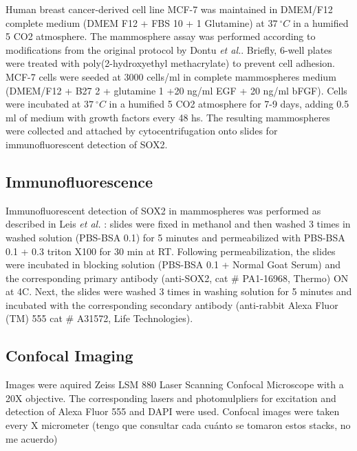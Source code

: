 \documentclass[fleqn,10pt]{wlscirep}
\begin{document}
Human breast cancer-derived cell line MCF-7 was maintained in DMEM/F12 complete medium (DMEM F12 + FBS 10 + 1 Glutamine) at $37 \ ^{\circ} C$ in a humified 5 CO2 atmosphere. The mammosphere assay was performed according to modifications \cite{Leis} from the original protocol by Dontu \emph{et al.}\cite{Dontu}. Briefly, 6-well plates were treated with poly(2-hydroxyethyl methacrylate) to prevent cell adhesion. MCF-7 cells were seeded at 3000 cells/ml in complete mammospheres medium (DMEM/F12 + B27 2 + glutamine 1 +20 ng/ml EGF + 20 ng/ml bFGF). Cells were incubated at $37\ ^{\circ} C$ 
 in a humified 5 CO2 atmosphere for 7-9 days, adding 0.5 ml of medium with growth factors every 48 hs. The resulting mammospheres were collected and attached by cytocentrifugation onto slides for immunofluorescent detection of SOX2.

\subsection*{Immunofluorescence}

Immunofluorescent detection of SOX2 in mammospheres was performed as described in Leis \emph{et al.} \cite{Leis}: slides were fixed in methanol and then washed 3 times in washed solution (PBS-BSA 0.1) for 5 minutes and permeabilized with PBS-BSA 0.1 + 0.3 triton X100 for 30 min at RT. Following permeabilization, the slides were incubated in blocking solution (PBS-BSA 0.1 + Normal Goat Serum) and the corresponding primary antibody (anti-SOX2, cat \# PA1-16968, Thermo)  ON at 4C. Next, the slides were washed 3 times in washing solution for 5 minutes and incubated with the corresponding secondary antibody (anti-rabbit Alexa Fluor (TM) 555 cat \# A31572, Life Technologies).   

\subsection*{Confocal Imaging}

Images were aquired Zeiss LSM 880 Laser Scanning Confocal Microscope with a 20X objective. The corresponding lasers and photomulpliers for excitation and detection of Alexa Fluor 555 and DAPI were used. Confocal images were taken every X micrometer (tengo que consultar cada cuánto se tomaron estos stacks, no me acuerdo)     
\end{document}
